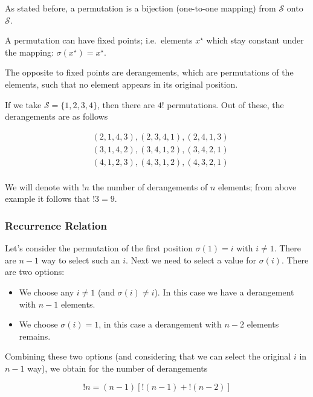 
As stated before, a permutation is a bijection (one-to-one mapping) from \(\mathcal{S}\) onto \(\mathcal{S}\).

A permutation can have fixed points; i.e.~elements \(x^\star\) which
stay constant under the mapping: \(\sigma(x^\star) = x^\star\).

The opposite to fixed points are derangements, which are permutations of the elements, such that no element appears in its original position.

If we take \(\mathcal{S} = \{1,2,3,4\}\), then there are \(4!\)
permutations. Out of these, the derangements are as follows


\begin{align*}
    & (2,1,4,3), (2,3,4,1), (2,4,1,3) \\
    & (3,1,4,2), (3,4,1,2), (3,4,2,1) \\
    & (4,1,2,3), (4,3,1,2), (4,3,2,1) \\ 
\end{align*}


We will denote with \(!n\) the number of derangements of \(n\) elements;
from above example it follows that \(!3 = 9\).

\subsubsection{Recurrence Relation}

Let's consider the permutation of the first position \(\sigma(1) = i\)
with \(i \neq 1\). There are \(n-1\) way to select such an \(i\). Next
we need to select a value for \(\sigma(i)\). There are two options:

\begin{itemize}
\item
  We choose any \(i \neq 1\) (and \(\sigma(i) \neq i\)). In this case we
  have a derangement with \(n-1\) elements.
\item
  We choose \(\sigma(i)=1\), in this case a derangement with \(n-2\)
  elements remains.
\end{itemize}

Combining these two options (and considering that we can select the
original \(i\) in \(n-1\) way), we obtain for the number of derangements

\begin{equation}
\label{recur}
!n = (n-1) \left[ !(n-1) +  !(n-2)\right]
\end{equation}

